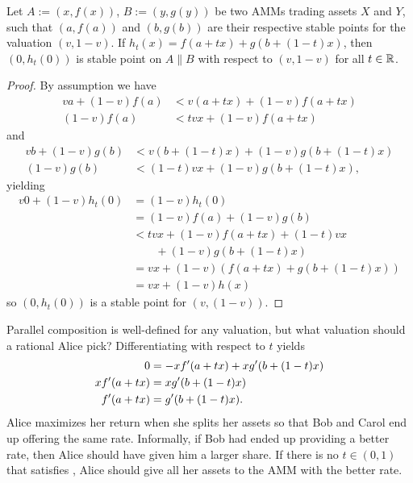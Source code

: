 \begin{lemma}
  Let $A := (x,f(x))$, $B := (y,g(y))$ be two AMMs trading assets $X$ and $Y$,
  such that $(a,f(a))$ and $(b,g(b))$ are their respective stable points
  for the valuation $(v,1-v)$.
  If $h_t(x) = f(a + tx) + g(b + (1-t)x)$,
  then $(0,h_t(0))$ is stable point on $A \| B$ with respect to $(v,1-v)$ for all $t \in \mathbb{R}$.
\end{lemma}

\begin{proof}
By assumption we have
\begin{align*}
    v a + (1-v)f(a) &< v(a + tx) + (1-v)f(a + tx)\\
    (1-v)f(a) &< tvx + (1-v)f(a + tx)
\end{align*}
and
\begin{align*}
  vb + (1-v)g(b) &< v(b + (1-t)x) + (1-v)g(b + (1-t)x)\\
  (1-v)g(b) &< (1-t)vx + (1-v)g(b + (1-t)x),
\end{align*}
yielding
\begin{align*}
  v 0 + (1-v)h_t(0)
  &= (1-v)h_t(0) \\
  &= (1-v)f(a) + (1-v)g(b) \\
  &< tvx + (1-v)f(a + tx) + (1-t)vx \\
  &\quad \quad + (1-v)g(b + (1-t)x) \\
  &= vx + (1-v)(f(a + tx) + g(b + (1-t)x)) \\
  &= vx + (1-v)h(x)
\end{align*}
so $(0,h_t(0))$ is a stable point for $(v,(1-v))$.
\end{proof}


Parallel composition is well-defined for any valuation,
but what valuation should a rational Alice pick?
Differentiating with respect to $t$ yields
\begin{align}
  0 &= -x f'(a+t x) + x g'(b+(1-t)x)\nonumber\\
  x f'(a+t x) &= x g'(b+(1-t)x) \nonumber\\
  f'(a+t x) &= g'(b+(1-t)x).\eqnlabel{best-split}
\end{align}
Alice maximizes her return when she splits her
assets so that Bob and Carol end up offering the same rate.
Informally, if Bob had ended up providing a better rate,
then Alice should have given him a larger share.
If there is no $t \in (0,1)$ that satisfies ,
Alice should give all her assets to the AMM with the better rate.

